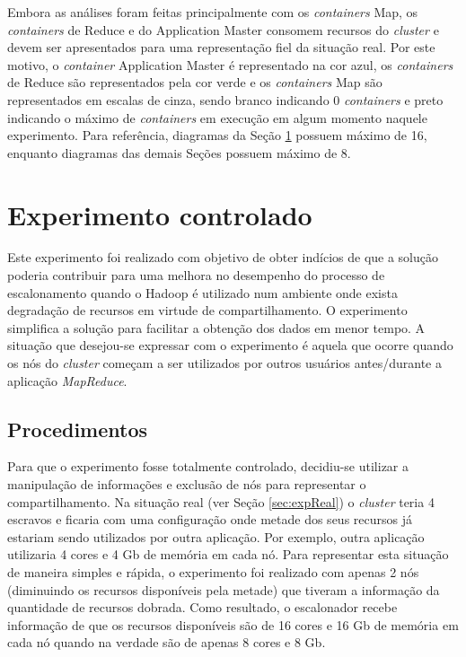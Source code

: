 Embora as análises foram feitas principalmente com os \textit{containers} Map, os \textit{containers} de Reduce e do Application Master consomem recursos do \textit{cluster} e devem ser apresentados para uma representação fiel da situação real. Por este motivo, o \textit{container} Application Master é representado na cor azul, os \textit{containers} de Reduce são representados pela cor verde e os \textit{containers} Map são representados em escalas de cinza, sendo branco indicando 0 \textit{containers} e preto indicando o máximo de \textit{containers} em execução em algum momento naquele experimento. Para referência, diagramas da Seção \ref{sec:expCont} possuem máximo de 16, enquanto diagramas das demais Seções possuem máximo de 8.

\section{Experimento controlado}
\label{sec:expCont}
Este experimento foi realizado com objetivo de obter indícios de que a solução poderia contribuir para uma melhora no desempenho do processo de escalonamento quando o Hadoop é utilizado num ambiente onde exista degradação de recursos em virtude de compartilhamento. O experimento simplifica a solução para facilitar a obtenção dos dados em menor tempo. A situação que desejou-se expressar com o experimento é aquela que ocorre quando os nós do \textit{cluster} começam a ser utilizados por outros usuários antes/durante a aplicação \textit{MapReduce}.

\subsection{Procedimentos}
Para que o experimento fosse totalmente controlado, decidiu-se utilizar a manipulação de informações e exclusão de nós para representar o compartilhamento. Na situação real (ver Seção \ref{sec:expReal}) o \textit{cluster} teria 4 escravos e ficaria com uma configuração onde metade dos seus recursos já estariam sendo utilizados por outra aplicação. Por exemplo, outra aplicação utilizaria 4 cores e 4 Gb de memória em cada nó. Para representar esta situação de maneira simples e rápida, o experimento foi realizado com apenas 2 nós (diminuindo os recursos disponíveis pela metade) que tiveram a informação da quantidade de recursos dobrada. Como resultado, o escalonador recebe informação de que os recursos disponíveis são de 16 cores e 16 Gb de memória em cada nó quando na verdade são de apenas 8 cores e 8 Gb. 


